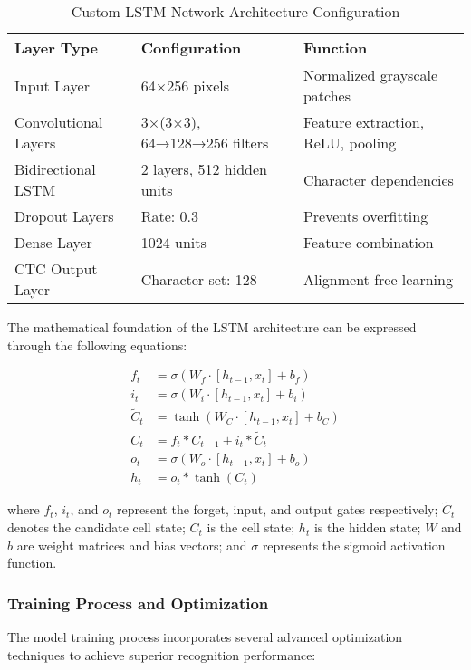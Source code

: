 \begin{table}[H]
\centering
\caption{Custom LSTM Network Architecture Configuration}
\label{tab:lstm_architecture}
{\begin{tabular}{lll}
\toprule
\textbf{Layer Type} & \textbf{Configuration} & \textbf{Function} \\
\midrule
Input Layer & 64×256 pixels & Normalized grayscale patches \\
Convolutional Layers & 3×(3×3), 64→128→256 filters & Feature extraction, ReLU, pooling \\
Bidirectional LSTM & 2 layers, 512 hidden units & Character dependencies \\
Dropout Layers & Rate: 0.3 & Prevents overfitting \\
Dense Layer & 1024 units & Feature combination \\
CTC Output Layer & Character set: 128 & Alignment-free learning \\
\bottomrule
\end{tabular}}
\end{table}

The mathematical foundation of the LSTM architecture can be expressed through the following equations:

\begin{align}
    f_t &= \sigma(W_f \cdot [h_{t-1}, x_t] + b_f) \\
    i_t &= \sigma(W_i \cdot [h_{t-1}, x_t] + b_i) \\
    \tilde{C}_t &= \tanh(W_C \cdot [h_{t-1}, x_t] + b_C) \\
    C_t &= f_t * C_{t-1} + i_t * \tilde{C}_t \\
    o_t &= \sigma(W_o \cdot [h_{t-1}, x_t] + b_o) \\
    h_t &= o_t * \tanh(C_t)
\end{align}

where $f_t$, $i_t$, and $o_t$ represent the forget, input, and output gates respectively; $\tilde{C}_t$ denotes the candidate cell state; $C_t$ is the cell state; $h_t$ is the hidden state; $W$ and $b$ are weight matrices and bias vectors; and $\sigma$ represents the sigmoid activation function.

\subsubsection{Training Process and Optimization}

The model training process incorporates several advanced optimization techniques to achieve superior recognition performance:

